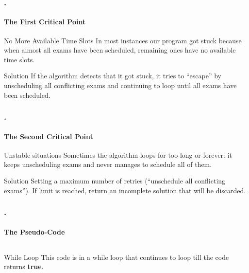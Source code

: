 \documentclass{beamer}
\begin{document}
\begin{frame}
\frametitle{\thesection.\thesubsection \ \insertsubsection}
\framesubtitle{The First Critical Point}
\begin{alertblock}{No More Available Time Slots}
	In most instances our program got stuck because when almost all exams have been scheduled, remaining ones have no available time slots.
\end{alertblock}
\begin{block}{Solution}
	 If the algorithm detects that it got stuck, it tries to ``escape'' by \alert{unscheduling all conflicting exams} and continuing to loop until all exams have been scheduled.
\end{block}

\end{frame}

\begin{frame}
\frametitle{\thesection.\thesubsection \ \insertsubsection}
\framesubtitle{The Second Critical Point}
\begin{alertblock}{Unstable situations}
	Sometimes the algorithm loops for too long or forever: it keeps unscheduling exams and never manages to schedule all of them.

\end{alertblock}
\begin{block}{Solution}
	Setting a maximum number of retries (``unschedule all conflicting exams''). If limit is reached, return an incomplete solution that will be discarded. %
\end{block}

\end{frame}

	\begin{frame}
	\frametitle{\thesection.\thesubsection \ \insertsubsection}
	\framesubtitle{The Pseudo-Code}
	\begin{columns}[onlytextwidth]
\begin{block}{While Loop}
	This code is in a while loop that continues to loop till the code returns \textbf{true}.
\end{block}
\end{columns}
	\end{frame}
\end{document}
